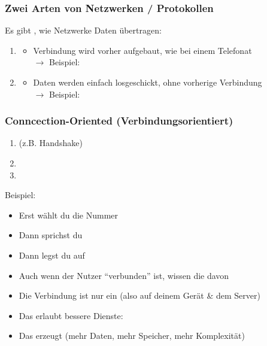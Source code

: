 \subsubsection*{Zwei Arten von Netzwerken / Protokollen}
Es gibt , wie Netzwerke Daten übertragen:
\begin{enumerate}
    \item {}
    \begin{itemize}
        \item Verbindung wird vorher aufgebaut, wie bei einem Telefonat\\
        $\rightarrow$ Beispiel: 
    \end{itemize} 
    \item {}
    \begin{itemize}
        \item Daten werden einfach losgeschickt, ohne vorherige Verbindung\\
        $\rightarrow$ Beispiel: 
    \end{itemize}
\end{enumerate}
\subsubsection*{Conncection-Oriented (Verbindungsorientiert)}
\begin{enumerate}
    \item {} (z.B. Handshake)
    \item {}
    \item {}
\end{enumerate}
Beispiel: 
\begin{itemize}
    \item Erst wählt du die Nummer
    \item Dann sprichst du
    \item Dann legst du auf
\end{itemize}
\begin{itemize}
    \item Auch wenn der Nutzer \enquote{verbunden} ist, wissen die  davon 
    \item Die Verbindung ist nur ein  (also auf deinem Gerät \& dem Server)
    \item Das erlaubt bessere Dienste: 
    \item {} Das erzeugt  (mehr Daten, mehr Speicher, mehr Komplexität)
\end{itemize}
